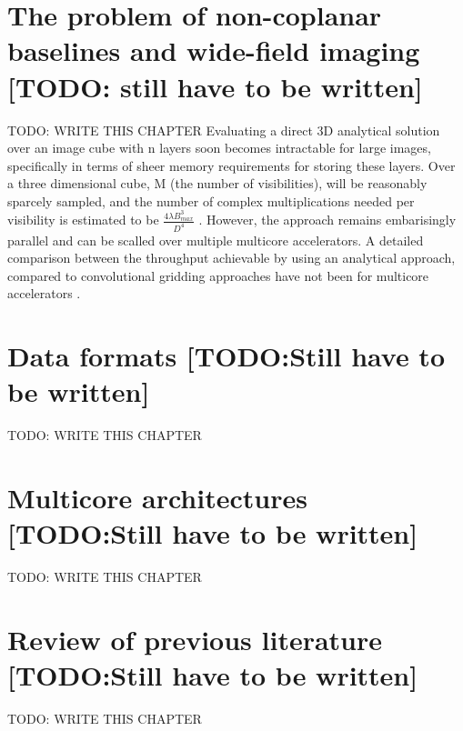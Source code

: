 \documentclass[a4paper,10pt]{report}
\begin{document}
 \section{The problem of non-coplanar baselines and wide-field imaging [TODO: still have to be written]}
 {\color{red} TODO: WRITE THIS CHAPTER}
 Evaluating a direct 3D analytical solution over an image cube with n layers soon becomes intractable for large images, specifically in terms of sheer memory requirements for storing these layers. Over a three dimensional cube, M (the number of visibilities),
 will be reasonably sparcely sampled, and the number of complex multiplications needed per visibility is estimated to be $\frac{4\lambda B_{max}^3}{D^4}$ \cite{yashar2009tdp}. However, the approach remains embarisingly parallel and can
 be scalled over multiple multicore accelerators. A detailed comparison between the throughput achievable by using an analytical approach, compared to convolutional gridding approaches have not been for multicore accelerators \cite{hardy2013direct}.
 \section{Data formats [TODO:Still have to be written]}
 {\color{red} TODO: WRITE THIS CHAPTER}
 \section{Multicore architectures [TODO:Still have to be written]}
 {\color{red} TODO: WRITE THIS CHAPTER}
 \section{Review of previous literature [TODO:Still have to be written]}
 {\color{red} TODO: WRITE THIS CHAPTER}


\end{document}
